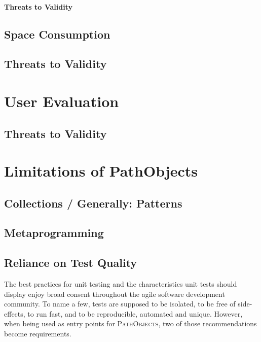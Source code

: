 \paragraph{Threats to Validity}

\subsection{Space Consumption}
\label{s:space-consumption}

\subsection{Threats to Validity}

\section{User Evaluation}
\subsection{Threats to Validity}

\section{Limitations of PathObjects}
\subsection{Collections / Generally: Patterns}
\subsection{Metaprogramming}

\subsection{Reliance on Test Quality} 
\label{ss:LimitationsTestQuality}
The best practices for unit testing and the characteristics unit tests should display enjoy broad consent throughout the agile software development community.
To name a few, tests are supposed to be isolated, to be free of side-effects, to run fast, and to be reproducible, automated and unique.
However, when being used as entry points for \textsc{PathObjects}, two of those recommendations become requirements.

